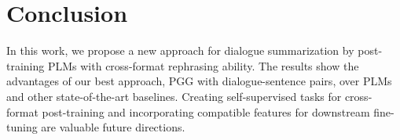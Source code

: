 \section{Conclusion}

In this work, we propose a new approach for dialogue summarization by post-training PLMs with cross-format rephrasing ability.
The results show the advantages of our best approach, PGG with dialogue-sentence pairs, over PLMs and other state-of-the-art baselines.
Creating self-supervised tasks for cross-format post-training and incorporating compatible features for downstream fine-tuning are valuable future directions. 